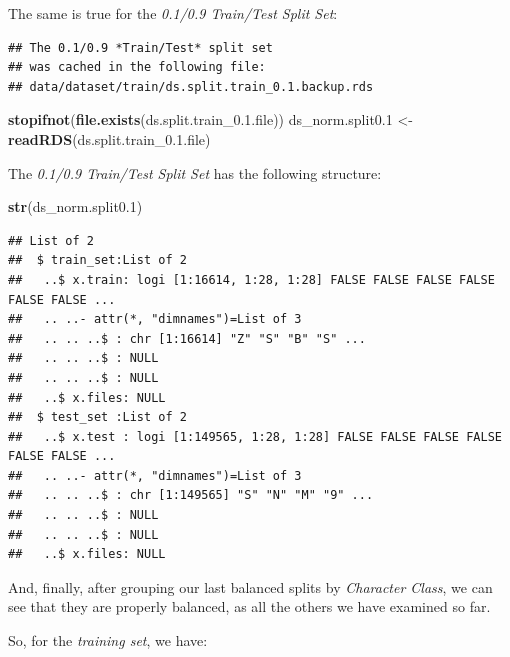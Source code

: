 \documentclass[
]{report}
\newenvironment{Shaded}{\begin{snugshade}}{\end{snugshade}}
\newcommand{\AttributeTok}[1]{\textcolor[rgb]{0.13,0.29,0.53}{#1}}
\newcommand{\FloatTok}[1]{\textcolor[rgb]{0.00,0.00,0.81}{#1}}
\newcommand{\FunctionTok}[1]{\textcolor[rgb]{0.13,0.29,0.53}{\textbf{#1}}}
\newcommand{\NormalTok}[1]{#1}
\newcommand{\OtherTok}[1]{\textcolor[rgb]{0.56,0.35,0.01}{#1}}
\newcommand{\SpecialCharTok}[1]{\textcolor[rgb]{0.81,0.36,0.00}{\textbf{#1}}}
\begin{document}
\normalsize

\newpage

The same is true for the \emph{0.1/0.9 Train/Test Split Set}:

\begin{verbatim}
## The 0.1/0.9 *Train/Test* split set 
## was cached in the following file:
## data/dataset/train/ds.split.train_0.1.backup.rds
\end{verbatim}

\begin{Shaded}
\begin{Highlighting}[]
\FunctionTok{stopifnot}\NormalTok{(}\FunctionTok{file.exists}\NormalTok{(ds.split.train\_0.}\FloatTok{1.}\NormalTok{file))}
\NormalTok{ds\_norm.split0}\FloatTok{.1} \OtherTok{\textless{}{-}} \FunctionTok{readRDS}\NormalTok{(ds.split.train\_0.}\FloatTok{1.}\NormalTok{file)}
\end{Highlighting}
\end{Shaded}

The \emph{0.1/0.9 Train/Test Split Set} has the following structure:

\begin{Shaded}
\begin{Highlighting}[]
\FunctionTok{str}\NormalTok{(ds\_norm.split0}\FloatTok{.1}\NormalTok{)}
\end{Highlighting}
\end{Shaded}

\begin{verbatim}
## List of 2
##  $ train_set:List of 2
##   ..$ x.train: logi [1:16614, 1:28, 1:28] FALSE FALSE FALSE FALSE FALSE FALSE ...
##   .. ..- attr(*, "dimnames")=List of 3
##   .. .. ..$ : chr [1:16614] "Z" "S" "B" "S" ...
##   .. .. ..$ : NULL
##   .. .. ..$ : NULL
##   ..$ x.files: NULL
##  $ test_set :List of 2
##   ..$ x.test : logi [1:149565, 1:28, 1:28] FALSE FALSE FALSE FALSE FALSE FALSE ...
##   .. ..- attr(*, "dimnames")=List of 3
##   .. .. ..$ : chr [1:149565] "S" "N" "M" "9" ...
##   .. .. ..$ : NULL
##   .. .. ..$ : NULL
##   ..$ x.files: NULL
\end{verbatim}

And, finally, after grouping our last balanced splits by \emph{Character Class}, we can see that they are properly balanced, as all the others we have examined so far.

\newpage

So, for the \emph{training set}, we have:

\begin{Shaded}
\end{Shaded}
\end{document}
